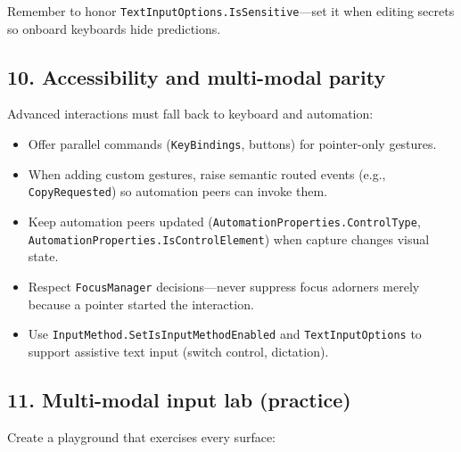 Remember to honor
\passthrough{\lstinline!TextInputOptions.IsSensitive!}---set it when
editing secrets so onboard keyboards hide predictions.

\subsection{10. Accessibility and multi-modal
parity}\label{accessibility-and-multi-modal-parity}

Advanced interactions must fall back to keyboard and automation:

\begin{itemize}
\tightlist
\item
  Offer parallel commands (\passthrough{\lstinline!KeyBindings!},
  buttons) for pointer-only gestures.
\item
  When adding custom gestures, raise semantic routed events (e.g.,
  \passthrough{\lstinline!CopyRequested!}) so automation peers can
  invoke them.
\item
  Keep automation peers updated
  (\passthrough{\lstinline!AutomationProperties.ControlType!},
  \passthrough{\lstinline!AutomationProperties.IsControlElement!}) when
  capture changes visual state.
\item
  Respect \passthrough{\lstinline!FocusManager!} decisions---never
  suppress focus adorners merely because a pointer started the
  interaction.
\item
  Use \passthrough{\lstinline!InputMethod.SetIsInputMethodEnabled!} and
  \passthrough{\lstinline!TextInputOptions!} to support assistive text
  input (switch control, dictation).
\end{itemize}

\subsection{11. Multi-modal input lab
(practice)}\label{multi-modal-input-lab-practice}

Create a playground that exercises every surface:

